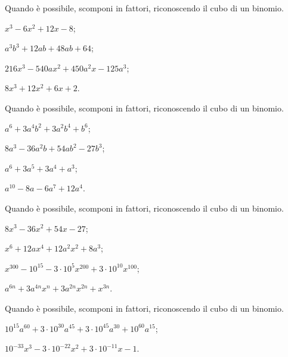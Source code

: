 \begin{esercizio}
\label{ese:13.43}
Quando è possibile, scomponi in fattori, riconoscendo il cubo di un binomio.
\begin{multicols}{2}
\begin{enumeratea}
 \item $x^{3}-6x^{2}+12x-8$;
 \item $a^{3}b^{3}+12ab+48ab+64$;
 \item $216x^{3}-540ax^{2}+450a^{2}x-125a^{3}$;
 \item $8x^{3}+12x^{2}+6x+2$.
\end{enumeratea}
\end{multicols}
\end{esercizio}

\begin{esercizio}[\Ast]
\label{ese:13.44}
Quando è possibile, scomponi in fattori, riconoscendo il cubo di un binomio.
\begin{multicols}{2}
\begin{enumeratea}
 \item $a^{6}+3a^{4}b^{2}+3a^{2}b^{4}+b^{6}$;
 \item $8a^{3}-36a^{2}b+54ab^{2}-27b^{3}$;
 \item $a^{6}+3a^{5}+3a^{4}+a^{3}$;
 \item $a^{10}-8a-6a^{7}+12a^{4}$.%
\end{enumeratea}
\end{multicols}
\end{esercizio}

\begin{esercizio}
\label{ese:13.45}
Quando è possibile, scomponi in fattori, riconoscendo il cubo di un binomio.
\begin{multicols}{2}
\begin{enumeratea}
 \item $8x^{3}-36x^{2}+54x-27$;
 \item $x^{6}+12ax^{4}+12a^{2}x^{2}+8a^{3}$;
 \item $x^{300}-10^{15}-3\cdot 10^{5}x^{200}+3\cdot 10^{10}x^{100}$;
 \item $a^{6n}+3a^{4n}x^{n}+3a^{2n}x^{2n}+x^{3n}$.
\end{enumeratea}
\end{multicols}
\end{esercizio}

\begin{esercizio}
\label{ese:13.46}
Quando è possibile, scomponi in fattori, riconoscendo il cubo di un binomio.
\begin{enumeratea}
 \item $10^{15}a^{60}+3\cdot 10^{30}a^{45}+3\cdot 10^{45}a^{30}+10^{60}a^{15}$;
 \item $10^{-33}x^{3}-3\cdot 10^{-22}x^{2}+3\cdot 10^{-11}x-1$.
\end{enumeratea}
\end{esercizio}


